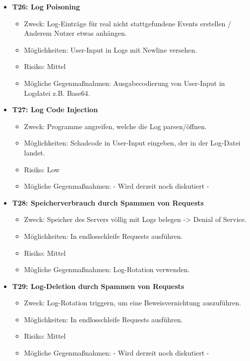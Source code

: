 \documentclass[12pt,DIV14,BCOR10mm,a4paper,parskip=half-,headsepline,headinclude,english,ngerman,bibliography=totocnumbered]{scrreprt}
\begin{document}
\begin{itemize}

  \hypertarget{threat26}{}
  \item \textbf{T26: Log Poisoning}
  \begin{itemize}
  \item Zweck: Log-Einträge für real nicht stattgefundene Events erstellen / Anderem Nutzer etwas anhängen.
  \item Möglichkeiten: User-Input in Logs mit Newline versehen.
  \item Risiko: Mittel
  \item Mögliche Gegenmaßnahmen: Ausgabecodierung von User-Input in Logdatei z.B. Base64.
  \end{itemize}

  \hypertarget{threat27}{}
  \item \textbf{T27: Log Code Injection}
  \begin{itemize}
  \item Zweck: Programme angreifen, welche die Log parsen/öffnen.
  \item Möglichkeiten: Schadcode in User-Input eingeben, der in der Log-Datei landet.
  \item Risiko: Low
  \item Mögliche Gegenmaßnahmen: - Wird derzeit noch diskutiert -
  \end{itemize}

  \hypertarget{threat28}{}
  \item \textbf{T28: Speicherverbrauch durch Spammen von Requests}
  \begin{itemize}
  \item Zweck: Speicher des Servers völlig mit Logs belegen -> Denial of Service.
  \item Möglichkeiten: In endlosschleife Requests ausführen.
  \item Risiko: Mittel
  \item Mögliche Gegenmaßnahmen: Log-Rotation verwenden.
  \end{itemize}
  
  \hypertarget{threat29}{}
  \item \textbf{T29: Log-Deletion durch Spammen von Requests}
  \begin{itemize}
  \item Zweck: Log-Rotation triggern, um eine Beweisvernichtung auszuführen.
  \item Möglichkeiten: In endlosschleife Requests ausführen.
  \item Risiko: Mittel
  \item Mögliche Gegenmaßnahmen: - Wird derzeit noch diskutiert -
  \end{itemize}


\end{itemize}
\end{document}
